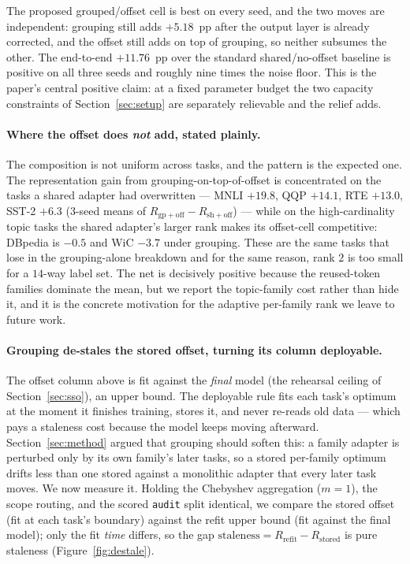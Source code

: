 \noindent The proposed grouped/offset cell is best on every seed, and the two moves
are independent: grouping still adds $+5.18$~pp after the output layer is already
corrected, and the offset still adds on top of grouping, so neither subsumes the
other. The end-to-end $+11.76$~pp over the standard shared/no-offset baseline is
positive on all three seeds and roughly nine times the noise floor. This is the
paper's central positive claim: at a fixed parameter budget the two capacity
constraints of Section~\ref{sec:setup} are separately relievable and the relief adds.

\paragraph{Where the offset does \emph{not} add, stated plainly.}
The composition is not uniform across tasks, and the pattern is the expected one. The
representation gain from grouping-on-top-of-offset is concentrated on the tasks a
shared adapter had overwritten --- MNLI $+19.8$, QQP $+14.1$, RTE $+13.0$, SST-2
$+6.3$ (3-seed means of $R_{\mathrm{gp{+}off}}-R_{\mathrm{sh{+}off}}$) --- while on the
high-cardinality topic tasks the shared adapter's larger rank makes its offset-cell
competitive: DBpedia is $-0.5$ and WiC $-3.7$ under grouping. These are the same tasks
that lose in the grouping-alone breakdown and for the same reason, rank $2$ is too
small for a $14$-way label set. The net is decisively positive because the reused-token
families dominate the mean, but we report the topic-family cost rather than hide it,
and it is the concrete motivation for the adaptive per-family rank we leave to future
work.

\paragraph{Grouping de-stales the stored offset, turning its column deployable.}
The offset column above is fit against the \emph{final} model (the rehearsal ceiling
of Section~\ref{sec:sso}), an upper bound. The deployable rule fits each task's optimum
at the moment it finishes training, stores it, and never re-reads old data --- which
pays a staleness cost because the model keeps moving afterward. Section~\ref{sec:method}
argued that grouping should soften this: a family adapter is perturbed only by its own
family's later tasks, so a stored per-family optimum drifts less than one stored against
a monolithic adapter that every later task moves. We now measure it. Holding the
Chebyshev aggregation ($m{=}1$), the scope routing, and the scored \texttt{audit} split
identical, we compare the stored offset (fit at each task's boundary) against the refit
upper bound (fit against the final model); only the fit \emph{time} differs, so the gap
$\text{staleness}=R_{\mathrm{refit}}-R_{\mathrm{stored}}$ is pure staleness
(Figure~\ref{fig:destale}).


